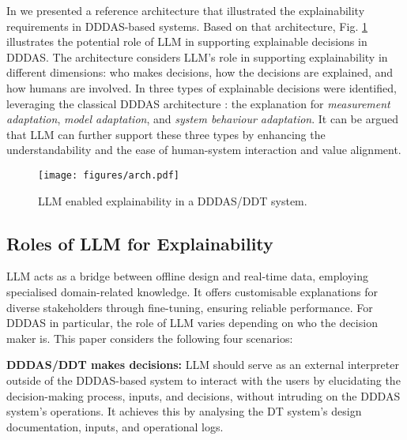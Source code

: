 \documentclass[runningheads]{llncs}
\begin{document}
In \cite{zhang_explainable_2024} we presented a reference architecture that illustrated the explainability requirements in DDDAS-based systems. Based on that architecture, Fig. \ref{fig:arch} illustrates the  potential role of LLM in supporting explainable decisions in DDDAS.   The architecture considers LLM's role in supporting explainability in different dimensions: who makes decisions, how the decisions are explained, and how humans are involved.
In \cite{zhang_explainable_2024} three types of explainable decisions were identified, leveraging the classical DDDAS architecture \cite{blasch_dddas_2018}: the explanation for \textit{measurement adaptation}, \textit{model adaptation}, and \textit{system behaviour adaptation}.
It can be argued that LLM can further support these three types by enhancing the understandability and the ease of human-system interaction and value alignment.
\begin{figure}[t]
\vspace{-.4cm}
\centering
\texttt{[image: figures/arch.pdf]}
\caption{LLM enabled explainability in a DDDAS/DDT system.} \label{fig:arch}
\vspace{-.5cm}
\end{figure}


\vspace{-.7cm}
\subsection{Roles of LLM for Explainability}

LLM acts as a bridge between offline design and real-time data, employing specialised domain-related knowledge. It offers customisable explanations for diverse stakeholders through fine-tuning, ensuring reliable performance. For DDDAS in particular, the role of LLM varies depending on who the decision maker is. This paper considers the following four scenarios:

\textbf{DDDAS/DDT makes decisions:}
LLM should serve as an external interpreter outside of the DDDAS-based system to interact with the users by elucidating the decision-making process, inputs, and decisions, without intruding on the DDDAS system's operations. It achieves this by analysing the DT system's design documentation, inputs, and operational logs. 
\end{document}
